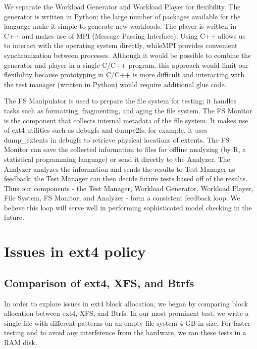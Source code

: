 \documentclass{acm_proc_article-sp}
\begin{document}
We separate the Workload Generator and Workload Player for flexibility. The generator is written in Python; the large number of packages available for the language make it simple to generate new workloads. The player is written in C++ and makes use of MPI (Message Passing Interface). Using C++ allows us to interact with the operating system directly, whileMPI provides convenient synchronization between processes. Although it would be possible to combine the generator and player in a single C/C++ program, this approach would limit our flexibility because prototyping in C/C++ is more difficult and interacting with the test manager (written in Python) would require additional glue code.
 
The FS Manipulator is used to prepare the file system for testing; it handles tasks such as formatting, fragmenting, and aging the file system. The FS Monitor is the component that collects internal metadata of the file system. It makes use of ext4 utilities such as debugfs and dumpe2fs; for example, it uses dump\_extents in debugfs to retrieve physical locations of extents. The FS Monitor can save the collected information to files for offline analyzing (by R, a statistical programming language) or send it directly to the Analyzer. The Analyzer analyzes the information and sends the results to Test Manager as feedback; the Test Manager can then decide future tests based off of the results. Thus our components - the Test Manager, Workload Generator, Workload Player, File System, FS Monitor, and Analyzer - form a consistent feedback loop. We believe this loop will serve well in performing sophisticated model checking in the future.
 


\section{Issues in ext4 policy}
\label{sec:Issues-in-ext4-policy}
\subsection{Comparison of ext4, XFS, and Btrfs}

In order to explore issues in ext4 block allocation, we began by comparing block allocation between ext4, XFS, and Btrfs. In our most prominent  test, we write a single file with different patterns on an empty file system 4 GB in size.  For faster testing and to avoid any interference from the hardware, we ran these tests in a RAM disk.  
 
\end{document}
